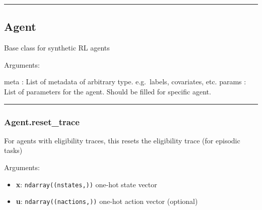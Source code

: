 \begin{Shaded}
\begin{Highlighting}[]
\end{Highlighting}
\end{Shaded}

\begin{center}\rule{0.5\linewidth}{\linethickness}\end{center}

\hypertarget{agent}{%
\subsection{Agent}\label{agent}}

\begin{Shaded}
\begin{Highlighting}[]
\end{Highlighting}
\end{Shaded}

Base class for synthetic RL agents

Arguments:

meta : List of metadata of arbitrary type. e.g.~labels, covariates, etc.
params : List of parameters for the agent. Should be filled for specific
agent.

\begin{center}\rule{0.5\linewidth}{\linethickness}\end{center}

\hypertarget{agent.reset_trace}{%
\subsubsection{Agent.reset\_trace}\label{agent.reset_trace}}

\begin{Shaded}
\begin{Highlighting}[]
\OperatorTok{=}\NormalTok{)}
\end{Highlighting}
\end{Shaded}

For agents with eligibility traces, this resets the eligibility trace
(for episodic tasks)

Arguments:

\begin{itemize}
\tightlist
\item
  \textbf{x}: \texttt{ndarray((nstates,))} one-hot state vector
\item
  \textbf{u}: \texttt{ndarray((nactions,))} one-hot action vector
  (optional)
\end{itemize}

